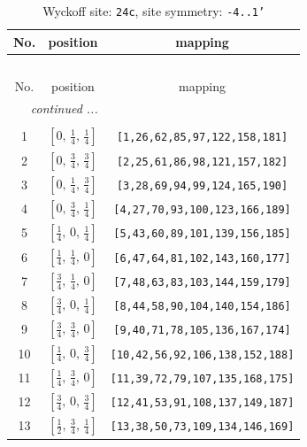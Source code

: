 \documentclass[fleqn,8pt]{jsarticle}
\begin{document}
\begin{longtable}{ccc}
\caption{Wyckoff site: {\tt 24c}, site symmetry: {\tt -4..1'}}
 \\
 \hline \hline
No. & position & mapping \\ \hline \endfirsthead

\multicolumn{2}{l}{\tablename\ \thetable{}} \\
 \hline \hline
No. & position & mapping \\ \hline \endhead

 \hline \hline
\multicolumn{2}{r}{\footnotesize\it continued ...} \\ \endfoot

 \hline \hline
\multicolumn{2}{r}{} \\ \endlastfoot

1 & $\left[ 0,\, \frac{1}{4},\, \frac{1}{4} \right]$ & {\tt [1,26,62,85,97,122,158,181]} \\ \hline
2 & $\left[ 0,\, \frac{3}{4},\, \frac{3}{4} \right]$ & {\tt [2,25,61,86,98,121,157,182]} \\ \hline
3 & $\left[ 0,\, \frac{1}{4},\, \frac{3}{4} \right]$ & {\tt [3,28,69,94,99,124,165,190]} \\ \hline
4 & $\left[ 0,\, \frac{3}{4},\, \frac{1}{4} \right]$ & {\tt [4,27,70,93,100,123,166,189]} \\ \hline
5 & $\left[ \frac{1}{4},\, 0,\, \frac{1}{4} \right]$ & {\tt [5,43,60,89,101,139,156,185]} \\ \hline
6 & $\left[ \frac{1}{4},\, \frac{1}{4},\, 0 \right]$ & {\tt [6,47,64,81,102,143,160,177]} \\ \hline
7 & $\left[ \frac{3}{4},\, \frac{1}{4},\, 0 \right]$ & {\tt [7,48,63,83,103,144,159,179]} \\ \hline
8 & $\left[ \frac{3}{4},\, 0,\, \frac{1}{4} \right]$ & {\tt [8,44,58,90,104,140,154,186]} \\ \hline
9 & $\left[ \frac{3}{4},\, \frac{3}{4},\, 0 \right]$ & {\tt [9,40,71,78,105,136,167,174]} \\ \hline
10 & $\left[ \frac{1}{4},\, 0,\, \frac{3}{4} \right]$ & {\tt [10,42,56,92,106,138,152,188]} \\ \hline
11 & $\left[ \frac{1}{4},\, \frac{3}{4},\, 0 \right]$ & {\tt [11,39,72,79,107,135,168,175]} \\ \hline
12 & $\left[ \frac{3}{4},\, 0,\, \frac{3}{4} \right]$ & {\tt [12,41,53,91,108,137,149,187]} \\ \hline
13 & $\left[ \frac{1}{2},\, \frac{3}{4},\, \frac{1}{4} \right]$ & {\tt [13,38,50,73,109,134,146,169]} \\ \hline

\end{longtable}
\end{document}
